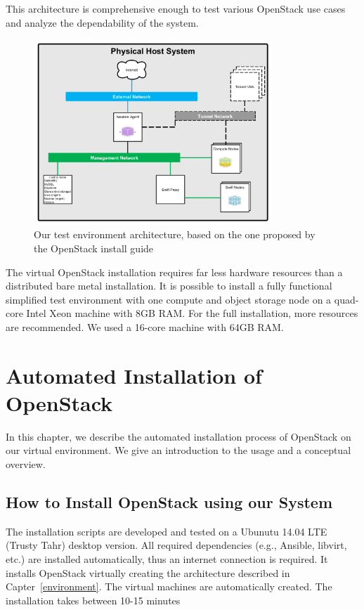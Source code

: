 This architecture is comprehensive enough to test various OpenStack use cases and analyze the dependability of the system.

\begin{figure}[h]
	\centering
		\includegraphics[width=0.80\textwidth]{images/architectureEN.PNG}
	\caption{Our test environment architecture, based on the one proposed by the OpenStack install guide}
	\label{fig:arch}
\end{figure}

The virtual OpenStack installation requires far less hardware resources than a distributed bare metal installation. It is possible to install a fully functional simplified test environment with one compute and object storage node on a quad-core Intel Xeon machine with 8GB RAM. For the full installation, more resources are recommended. We used a 16-core machine with 64GB RAM. 

\section{Automated Installation of OpenStack}
\label{installing}

In this chapter, we describe the automated installation process of OpenStack on our virtual environment. We give an introduction to the usage and a conceptual overview.

\subsection{How to Install OpenStack using our System}
The installation scripts are developed and tested on a Ubunutu 14.04 LTE (Trusty Tahr) desktop version. All required dependencies (e.g., Ansible, libvirt, etc.) are installed automatically, thus an internet connection is required. It installs OpenStack virtually creating the architecture described in Capter~\ref{environment}. The virtual machines are automatically created. The installation takes between 10-15 minutes


